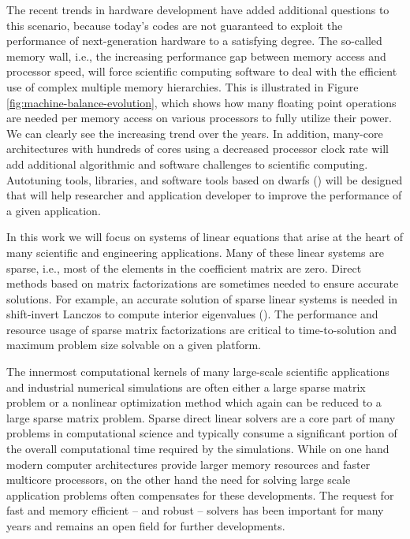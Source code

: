 The recent trends in hardware development have added additional questions to this scenario, because today's codes are not guaranteed to exploit the performance of next-generation hardware to a satisfying degree. The so-called memory wall, i.e., the increasing performance gap between memory access and processor speed, will force scientific computing software to deal with the efficient use of complex multiple memory hierarchies. {\color{blue} This is illustrated in Figure \ref{fig:machine-balance-evolution}, which shows how many floating point operations are needed per memory access on various processors to fully utilize their power. We can clearly see the increasing trend over the years.} In addition, many-core architectures with hundreds of cores using a decreased processor clock rate will add additional algorithmic and software challenges to scientific computing. Autotuning tools, libraries, and software tools based on dwarfs (\cite{10.1145/1562764.1562783}) will be designed that will help researcher and application developer to improve the performance of a given application.

In this work we will focus on systems of linear equations that arise at the heart of many scientific and engineering applications. Many of these linear systems are sparse, i.e., most of the elements in the coefficient matrix are zero. Direct methods based on matrix factorizations are sometimes needed to ensure accurate solutions. For example, an accurate solution of sparse linear systems is needed in shift-invert Lanczos to compute interior eigenvalues (\cite{lanczos-1980,https://doi.org/10.1002/nme.6640}). The performance and resource usage of sparse matrix factorizations are critical to time-to-solution and maximum problem size solvable on a given platform.

The innermost computational kernels of many large-scale scientific applications and industrial numerical simulations are often either a large sparse matrix problem or a nonlinear optimization method which again can be reduced to a large sparse matrix problem. Sparse direct linear solvers are a core part of many problems in computational science and typically consume a significant portion of the overall computational time required by the simulations. While on one hand modern computer architectures provide larger memory resources and faster multicore processors, on the other hand the need for solving large scale application problems often compensates for these developments. The request for fast and memory efficient -- and robust -- solvers has been important for many years and remains an open field for further developments.

